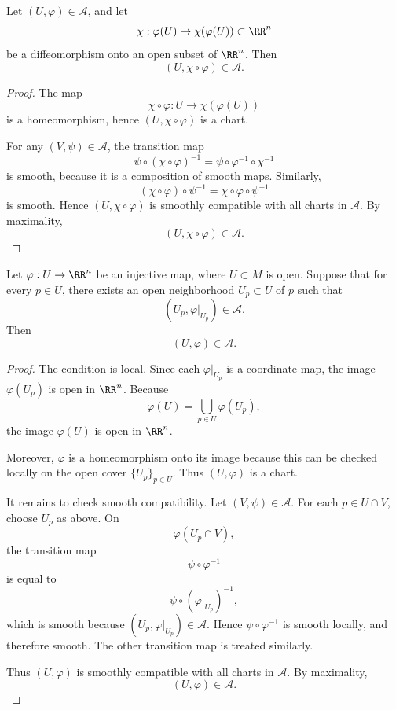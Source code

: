 \begin{exercise}
Let $(U,\varphi)\in\mathcal A$, and let
\[
  \chi:\varphi(U)\to \chi(\varphi(U))\subset \RR^n
\]
be a diffeomorphism onto an open subset of $\RR^n$. Then
\[
  (U,\chi\circ\varphi)\in \mathcal A.
\]
\end{exercise}

\begin{proof}
The map
\[
  \chi\circ\varphi:U\to \chi(\varphi(U))
\]
is a homeomorphism, hence $(U,\chi\circ\varphi)$ is a chart.

For any $(V,\psi)\in\mathcal A$, the transition map
\[
  \psi\circ(\chi\circ\varphi)^{-1}
  =
  \psi\circ\varphi^{-1}\circ\chi^{-1}
\]
is smooth, because it is a composition of smooth maps. Similarly,
\[
  (\chi\circ\varphi)\circ\psi^{-1}
  =
  \chi\circ\varphi\circ\psi^{-1}
\]
is smooth. Hence $(U,\chi\circ\varphi)$ is smoothly compatible with all charts in $\mathcal A$. By maximality,
\[
  (U,\chi\circ\varphi)\in\mathcal A.
\]
\end{proof}

\begin{exercise}
Let $\varphi:U\to \RR^n$ be an injective map, where $U\subset M$ is open. Suppose that for every $p\in U$, there exists an open neighborhood $U_p\subset U$ of $p$ such that
\[
  (U_p,\varphi|_{U_p})\in\mathcal A.
\]
Then
\[
  (U,\varphi)\in\mathcal A.
\]
\end{exercise}

\begin{proof}
The condition is local. Since each $\varphi|_{U_p}$ is a coordinate map, the image $\varphi(U_p)$ is open in $\RR^n$. Because
\[
  \varphi(U)=\bigcup_{p\in U}\varphi(U_p),
\]
the image $\varphi(U)$ is open in $\RR^n$.

Moreover, $\varphi$ is a homeomorphism onto its image because this can be checked locally on the open cover $\{U_p\}_{p\in U}$. Thus $(U,\varphi)$ is a chart.

It remains to check smooth compatibility. Let $(V,\psi)\in\mathcal A$. For each $p\in U\cap V$, choose $U_p$ as above. On
\[
  \varphi(U_p\cap V),
\]
the transition map
\[
  \psi\circ\varphi^{-1}
\]
is equal to
\[
  \psi\circ(\varphi|_{U_p})^{-1},
\]
which is smooth because $(U_p,\varphi|_{U_p})\in\mathcal A$. Hence $\psi\circ\varphi^{-1}$ is smooth locally, and therefore smooth. The other transition map is treated similarly.

Thus $(U,\varphi)$ is smoothly compatible with all charts in $\mathcal A$. By maximality,
\[
  (U,\varphi)\in\mathcal A.
\]
\end{proof}

